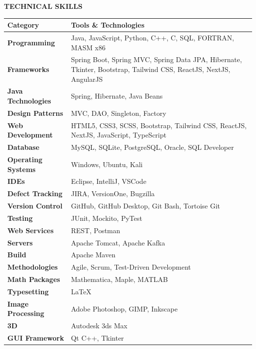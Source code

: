 \documentclass[a4paper, 12pt]{article}
\begin{document}
\begin{flushleft}
\faCogs\quad\textbf{TECHNICAL SKILLS}\\[6pt]
\begin{tabularx}{\textwidth}{@{}lX@{}}
\toprule
\textbf{Category} & \textbf{Tools \& Technologies}\\
\midrule
\textbf{Programming}        & Java, JavaScript, Python, C++, C, SQL, FORTRAN, MASM x86 \\
\textbf{Frameworks}         & Spring Boot, Spring MVC, Spring Data JPA, Hibernate,
                              Tkinter, Bootstrap, Tailwind CSS, ReactJS, NextJS, AngularJS \\
\textbf{Java Technologies}  & Spring, Hibernate, Java Beans \\
\textbf{Design Patterns}    & MVC, DAO, Singleton, Factory \\
\textbf{Web Development}    & HTML5, CSS3, SCSS, Bootstrap, Tailwind CSS,
                              ReactJS, NextJS, JavaScript, TypeScript \\
\textbf{Database}           & MySQL, SQLite, PostgreSQL, Oracle, SQL Developer \\
\textbf{Operating Systems}  & Windows, Ubuntu, Kali \\
\textbf{IDEs}               & Eclipse, IntelliJ, VSCode \\
\textbf{Defect Tracking}    & JIRA, VersionOne, Bugzilla \\
\textbf{Version Control}    & GitHub, GitHub Desktop, Git Bash, Tortoise Git \\
\textbf{Testing}            & JUnit, Mockito, PyTest \\
\textbf{Web Services}       & REST, Postman \\
\textbf{Servers}            & Apache Tomcat, Apache Kafka \\
\textbf{Build}              & Apache Maven \\
\textbf{Methodologies}      & Agile, Scrum, Test-Driven Development \\
\textbf{Math Packages}      & Mathematica, Maple, MATLAB \\
\textbf{Typesetting}        & \LaTeX \\
\textbf{Image Processing}   & Adobe Photoshop, GIMP, Inkscape \\
\textbf{3D}                 & Autodesk 3ds Max \\
\textbf{GUI Framework}      & Qt C++, Tkinter \\
\bottomrule
\end{tabularx}
\end{flushleft}
\end{document}
